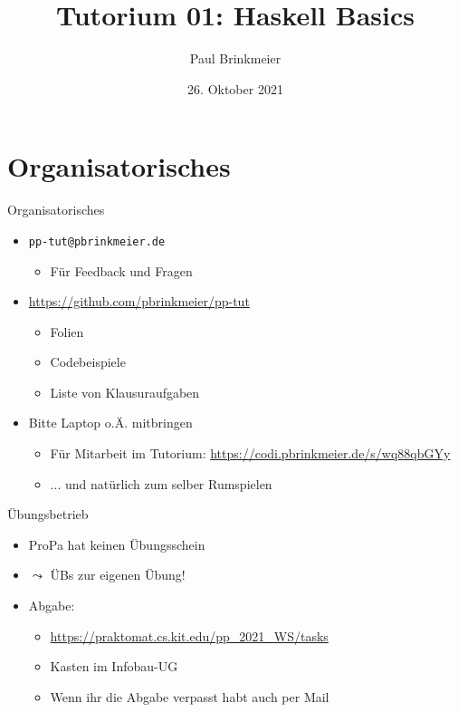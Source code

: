\documentclass{beamer}
\title{Tutorium 01: Haskell Basics}
\author{Paul Brinkmeier}
\institute{Tutorium Programmierparadigmen am KIT}
\date{26. Oktober 2021}
\begin{document}
\begin{frame}
        \titlepage
\end{frame}

\section{Organisatorisches}

\begin{frame}{Organisatorisches}
        \begin{itemize}
                \item \texttt{pp-tut@pbrinkmeier.de}
                \begin{itemize}
                        \item Für Feedback und Fragen
                \end{itemize}
                \item \url{https://github.com/pbrinkmeier/pp-tut}
                \begin{itemize}
                        \item Folien
                        \item Codebeispiele
                        \item Liste von Klausuraufgaben
                \end{itemize}
                \item Bitte Laptop o.Ä. mitbringen
                \begin{itemize}
                    \item Für Mitarbeit im Tutorium: \url{https://codi.pbrinkmeier.de/s/wq88qbGYy}
                    \item ... und natürlich zum selber Rumspielen
                \end{itemize}
        \end{itemize}
\end{frame}

\begin{frame}{Übungsbetrieb}
        \begin{itemize}
                \item ProPa hat keinen Übungsschein
                \item $\leadsto$ ÜBs zur eigenen Übung!
                \item Abgabe:
                \begin{itemize}
                  \item \url{https://praktomat.cs.kit.edu/pp_2021_WS/tasks}
                  \item Kasten im Infobau-UG
                  \item Wenn ihr die Abgabe verpasst habt auch per Mail
                \end{itemize}
        \end{itemize}
\end{frame}
\end{document}
